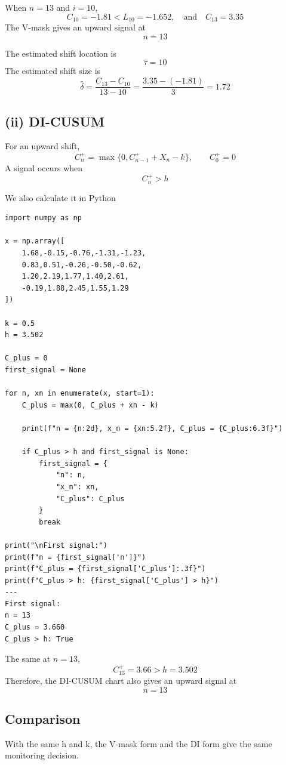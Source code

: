\documentclass[a4paper, 12pt]{article}  %
\begin{document}
When \(n=13\) and \(i=10\),
$$C_{10} = -1.81 < L_{10} = -1.652,\quad\text{and　} C_{13} = 3.35$$
The V-mask gives an upward signal at
\[
n=13
\]

The estimated shift location is
\[
\hat{\tau}=10
\]
The estimated shift size is
\[
\hat{\delta}
=
\frac{C_{13}-C_{10}}{13-10}
=
\frac{3.35-(-1.81)}{3}
=
1.72
\]

\subsection*{(ii) DI-CUSUM}

For an upward shift,
\[
C_n^+=\max\{0,C_{n-1}^+ + X_n-k\},
\qquad C_0^+=0
\]
A signal occurs when
\[
C_n^+>h
\]

We also calculate it in Python
\begin{codeblock}
\begin{verbatim}
import numpy as np

x = np.array([
    1.68,-0.15,-0.76,-1.31,-1.23,
    0.83,0.51,-0.26,-0.50,-0.62,
    1.20,2.19,1.77,1.40,2.61,
    -0.19,1.88,2.45,1.55,1.29
])

k = 0.5
h = 3.502

C_plus = 0
first_signal = None

for n, xn in enumerate(x, start=1):
    C_plus = max(0, C_plus + xn - k)

    print(f"n = {n:2d}, x_n = {xn:5.2f}, C_plus = {C_plus:6.3f}")

    if C_plus > h and first_signal is None:
        first_signal = {
            "n": n,
            "x_n": xn,
            "C_plus": C_plus
        }
        break

print("\nFirst signal:")
print(f"n = {first_signal['n']}")
print(f"C_plus = {first_signal['C_plus']:.3f}")
print(f"C_plus > h: {first_signal['C_plus'] > h}")
---
First signal:
n = 13
C_plus = 3.660
C_plus > h: True        
\end{verbatim}
\end{codeblock}

The same at \(n=13\),
\[
C_{13}^+=3.66>h=3.502
\]
Therefore, the DI-CUSUM chart also gives an upward signal at
\[
n=13
\]

\subsection*{Comparison}

With the same h and k, the V-mask form and the DI form give the same monitoring decision.
\end{document}
